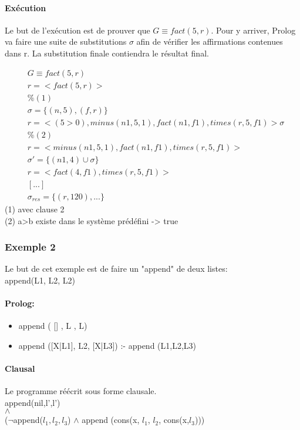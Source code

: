\paragraph{Exécution} 
Le but de l'exécution est de prouver que $G \equiv fact(5, r)$. Pour y arriver, Prolog va faire une suite de substitutions $\sigma$ afin de vérifier les affirmations contenues dans r. La substitution finale contiendra le résultat final.

\begin{align*}
& G \equiv fact(5,r) \\
& r= < fact(5, r) > \\
& \% (1) \\
& \sigma = \{ (n, 5), (f, r) \} \\
& r= < ( 5>0 ), minus(n1, 5, 1), fact(n1, f1), times(r, 5, f1) > \sigma \\
& \% (2) \\
& r= < minus(n1, 5, 1), fact(n1, f1), times(r, 5, f1) > \\
& \sigma'= \{ (n1, 4) \cup \sigma\} \\
& r= < fact (4, f1), times(r, 5, f1) > \\
& [...]\\
& \sigma_{res} = \{(r,120),...\} 
\end{align*}
(1) avec clause 2\\
(2) a>b existe dans le système prédéfini -> true\\

\subsubsection{Exemple 2}
Le but de cet exemple est de faire un "append" de deux listes:\\
append(L1, L2, L2)
\paragraph{Prolog:}
\begin{itemize}
\item append ( [] , L , L)
\item append ([X|L1], L2, [X|L3]) :- append (L1,L2,L3)
\end{itemize}
\paragraph{Clausal}
Le programme réécrit sous forme clausale.\\
append(nil,l',l')\\
$\land$\\
($\neg$append($l_1,l_2,l_3$) $\land$ append (cons(x, $l_1$, $l_2$, cons(x,$l_3$)))
